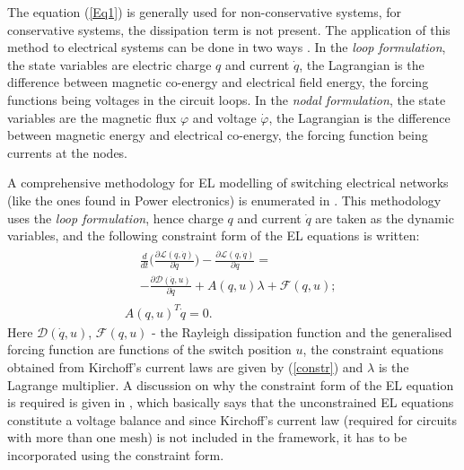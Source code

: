 \documentclass[preprint,12pt]{elsarticle}
\begin{document}
The equation (\ref{Eq1}) is generally used for non-conservative systems, for conservative systems, the dissipation term is not present. The application of this method to electrical systems can be done in two ways \citep{jmeisel}. In the \textit{loop formulation}, the state variables are electric charge $q$ and current $\dot{q}$, the Lagrangian is the difference between magnetic co-energy and electrical field energy, the forcing functions being voltages in the circuit loops. In the \textit{nodal formulation}, the state variables are the magnetic flux $\varphi$ and voltage $\dot{\varphi}$, the Lagrangian is the difference between magnetic energy and electrical co-energy, the forcing function being currents at the nodes.

A comprehensive methodology for EL modelling of switching electrical networks (like the ones found in Power electronics) is enumerated in \citep{scherpen_2003}. This methodology uses the \textit{loop formulation}, hence charge $q$ and current $\dot{q}$ are taken as the dynamic variables, and the following constraint form of the EL equations is written:
\begin{eqnarray}\label{elc}
\begin{split}
&\frac{d}{d t} \Biggl( \frac{ \partial \mathcal{L}(q,\dot{q})}{\partial \dot{q}}\Biggr)-\frac{ \partial \mathcal{L}(q,\dot{q})}{\partial q}=\\
& -\frac{\partial \mathcal{D}(\dot{q},u)}{\partial \dot{q}}+A(q,u)\lambda+\mathcal{F}(q,u);
\end{split}\\
A(q,u)^T\dot{q}=0.\label{eld}
\label{constr}
\end{eqnarray}
Here $\mathcal{D}(\dot{q},u)$, $\mathcal{F}(q,u)$ -  the Rayleigh dissipation function and the generalised forcing function are functions of the switch position $u$, the constraint equations obtained from Kirchoff's current laws are given by (\ref{constr}) and $\lambda$ is the Lagrange multiplier. A discussion on why the constraint form of the EL equation is required is given in \cite{scherpen_2003}, which basically says that the unconstrained EL equations constitute a voltage balance and since Kirchoff's current law (required for circuits with more than one mesh) is not included in the framework, it has to be incorporated using the constraint form.  \par
\end{document}
